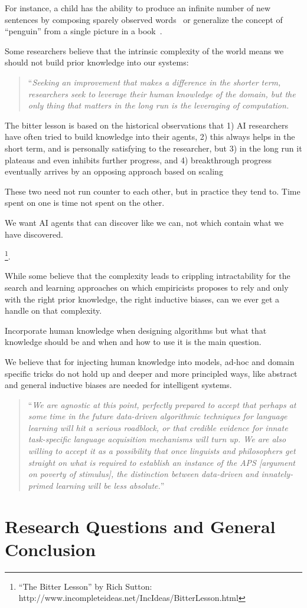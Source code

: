 For instance, a child has the ability to produce an infinite number of new sentences by composing sparely observed words~\citep{lake2017building} or generalize the concept of ``penguin'' from a single picture in a book~\citep{vinyals2016matching}. 







% 
Some researchers believe that the intrinsic complexity of the world means we should not build prior knowledge into our systems:
\begin{quote}
``\emph{Seeking an improvement that makes a difference in the shorter term, researchers seek to leverage their human knowledge of the domain, but the only thing that matters in the long run is the leveraging of computation.}
\end{quote}


 The bitter lesson is based on the historical observations that 1) AI researchers have often tried to build knowledge into their agents, 2) this always helps in the short term, and is personally satisfying to the researcher, but 3) in the long run it plateaus and even inhibits further progress, and 4) breakthrough progress eventually arrives by an opposing approach based on scaling 


These two need not run counter to each other, but in practice they tend to. Time spent on one is time not spent on the other.


We want AI agents that can discover like we can, not which contain what we have discovered. 

\footnote{``The Bitter Lesson'' by Rich Sutton: http://www.incompleteideas.net/IncIdeas/BitterLesson.html}.  

While some believe that the complexity leads to crippling intractability for the search and learning approaches on which empiricists proposes to rely and only with the right prior knowledge, the right inductive biases, can we ever get a handle on that complexity.

Incorporate human knowledge when designing algorithms  but what that knowledge should be and when and how to use it is the main question.

We believe that for injecting human knowledge into models, ad-hoc and domain specific tricks do not hold up and deeper and more principled ways, like abstract and general inductive biases are needed for intelligent systems.


\begin{quote}
``\emph{We are agnostic at this point, perfectly prepared to accept that
perhaps at some time in the future data-driven algorithmic techniques for language learning will hit a serious roadblock, or that credible evidence for innate
task-specific language acquisition mechanisms will turn up. We are also willing to accept it as a possibility that once linguists and philosophers get straight
on what is required to establish an instance of the APS [argument on poverty of stimulus], the distinction between data-driven and innately-primed learning will be less absolute.}''~\citep{pullum2002empirical}
\end{quote}


\section{Research Questions and General Conclusion}